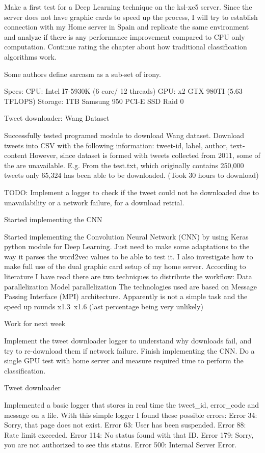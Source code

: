 Make a first test for a Deep Learning technique on the ksl-xe5 server.
Since the server does not have graphic cards to speed up the process, I will try to establish connection with my Home server in Spain and replicate the same environment and analyze if there is any performance improvement compared to CPU only computation.
Continue rating the chapter about how traditional classification algorithms work.

Some authors define sarcasm as a sub-set of irony.

Specs:
CPU: Intel I7-5930K (6 core/ 12 threads)
GPU: x2 GTX 980TI (5.63 TFLOPS)
Storage: 1TB Samsung 950 PCI-E SSD Raid 0

Tweet downloader: Wang Dataset

Successfully tested programed module to download Wang dataset. Download tweets into CSV with the following information:
tweet-id, label, author, text-content
However, since dataset is formed with tweets collected from 2011, some of the are unavailable. E.g. From the test.txt, which originally contains 250,000 tweets only 65,324 has been able to be downloaded. (Took 30 hours to download)

TODO: Implement a logger to check if the tweet could not be downloaded due to unavailability or a network failure, for a download retrial.

Started implementing the CNN

Started implementing the Convolution Neural Network (CNN) by using Keras\cite{keras} python module for Deep Learning.
Just need to make some adaptations to the way it parses the word2vec values to be able to test it.
I also investigate how to make full use of the dual graphic card setup of my home server. According to literature I have read there are two techniques to distribute the workflow:
Data parallelization
Model parallelization
The technologies used are based on Message Passing Interface (MPI) architecture. Apparently is not a simple task and the speed up rounds x1.3~x1.6 (last percentage being very unlikely)

Work for next week

Implement the tweet downloader logger to understand why downloads fail, and try to re-download them if network failure.
Finish implementing the CNN.
Do a single GPU test with home server and measure required time to perform the classification.

Tweet downloader

Implemented a basic logger that stores in real time the tweet\_id, error\_code and message on a file. With this simple logger I found these possible errors:
Error 34: Sorry, that page does not exist.
Error 63: User has been suspended.
Error 88: Rate limit exceeded.
Error 114: No status found with that ID.
Error 179: Sorry, you are not authorized to see this status.
Error 500: Internal Server Error.

